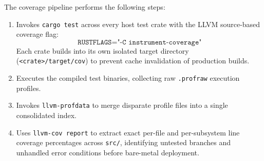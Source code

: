 The coverage pipeline performs the following steps:
\begin{enumerate}
    \item Invokes \texttt{cargo test} across every host test crate with the LLVM source-based coverage flag:
    \begin{equation}
    \texttt{RUSTFLAGS} = \texttt{"-C instrument-coverage"}
    \end{equation}
    Each crate builds into its own isolated target directory (\texttt{<crate>/target/cov}) to prevent cache invalidation of production builds.
    \item Executes the compiled test binaries, collecting raw \texttt{.profraw} execution profiles.
    \item Invokes \texttt{llvm-profdata} to merge disparate profile files into a single consolidated index.
    \item Uses \texttt{llvm-cov report} to extract exact per-file and per-subsystem line coverage percentages across \texttt{src/}, identifying untested branches and unhandled error conditions before bare-metal deployment.
\end{enumerate}
